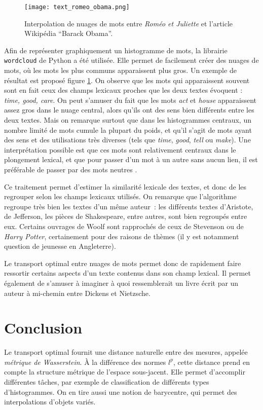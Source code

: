\begin{figure}
\centering
\texttt{[image: text\_romeo\_obama.png]}
\caption{Interpolation de nuages de mots entre \emph{Roméo et Juliette} et l'article Wikipédia ``Barack Obama''.}
\label{fig:romeo_obama}
\end{figure}

Afin de représenter graphiquement un histogramme de mots, la librairie \texttt{wordcloud} de Python a été utilisée. Elle permet de facilement créer des nuages de mots, où les mots les plus communs apparaissent plus gros.
Un exemple de résultat est proposé figure \ref{fig:romeo_obama}.
On observe que les mots qui apparaissent souvent sont en fait ceux des champs lexicaux proches que les deux textes évoquent : \emph{time, good, care}.
On peut s'amuser du fait que les mots \emph{act} et \emph{house} apparaissent assez gros dans le nuage central, alors qu'ils ont des sens bien différents entre les deux textes.
Mais on remarque surtout que dans les histogrammes centraux, un nombre limité de mots cumule la plupart du poids, et qu'il s'agit de mots ayant des sens et des utilisations très diverses (tels que \emph{time}, \emph{good}, \emph{tell} ou \emph{make}).
Une interprétation possible est que ces mots sont relativement centraux dans le plongement lexical, et que pour passer d'un mot à un autre sans aucun lien, il est préférable de passer par des mots \og neutres \fg.

Ce traitement permet d'estimer la similarité lexicale des textes, et donc de les regrouper selon les champs lexicaux utilisés. On remarque que l'algorithme regroupe très bien les textes d'un même auteur~: les différents textes d'Aristote, de Jefferson, les pièces de Shakespeare, entre autres, sont bien regroupés entre eux. Certains ouvrages de Woolf sont rapprochés de ceux de Stevenson ou de \emph{Harry Potter}, certainement pour des raisons de thèmes (il y est notamment question de jeunesse en Angleterre).

Le transport optimal entre nuages de mots permet donc de rapidement faire ressortir certains aspects d'un texte contenus dans son champ lexical.
Il permet également de s'amuser à imaginer à quoi ressemblerait un livre écrit par un auteur à mi-chemin entre Dickens et Nietzsche.


\section{Conclusion}

Le transport optimal fournit une distance naturelle entre des mesures, appelée \emph{métrique de Wasserstein}. À la différence des normes $l^p$, cette distance prend en compte la structure métrique de l'espace sous-jacent. Elle permet d'accomplir différentes tâches, par exemple de classification de différents types d'histogrammes. On en tire aussi une notion de barycentre, qui permet des interpolations d'objets variés.

